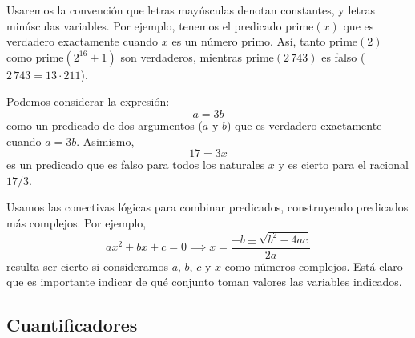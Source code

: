   Usaremos la convención que letras mayúsculas denotan constantes,
  y letras minúsculas variables.%
  Por ejemplo,
  tenemos el predicado \(\text{prime}(x)\)
  que es verdadero exactamente cuando \(x\) es un número primo.
  Así,
  tanto \(\text{prime}(2)\)
  como \(\text{prime}(2^{16} + 1)\) son verdaderos,
  mientras \(\text{prime}(2\,743)\) es falso
  (\(2\,743 = 13 \cdot 211\)).

  Podemos considerar la expresión:
  \begin{equation*}
    a = 3 b
  \end{equation*}
  como un predicado de dos argumentos
  (\(a\) y \(b\))
  que es verdadero exactamente cuando \(a = 3 b\).
  Asimismo,
  \begin{equation*}
    17 = 3 x
  \end{equation*}
  es un predicado que es falso para todos los naturales \(x\)
  y es cierto para el racional \(17 / 3\).

  Usamos las conectivas lógicas para combinar predicados,%
  construyendo predicados más complejos.
  Por ejemplo,
  \begin{equation*}
    a x^2 + b x + c = 0
       \implies x = \frac{-b \pm \sqrt{b^2 - 4 a c}}{2a}
  \end{equation*}
  resulta ser cierto
  si consideramos \(a\), \(b\), \(c\) y \(x\)
  como números complejos.
  Está claro que es importante indicar
  de qué conjunto toman valores las variables indicados.

\subsection{Cuantificadores}
\label{sec:cuantificadores}


